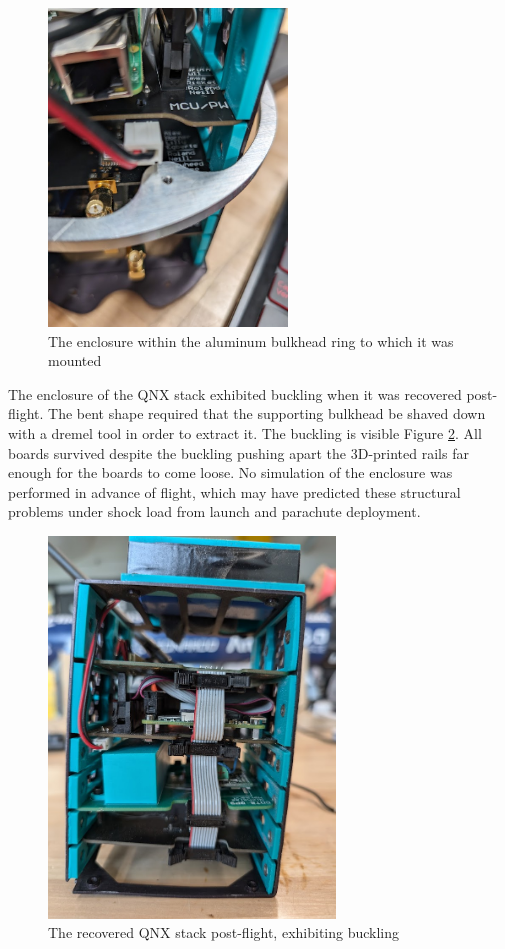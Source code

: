 \begin{figure}[H]
    \center
    \includegraphics[width=2.5in]{assets/images/stack-bulkhead.jpg}
    \caption{The enclosure within the aluminum bulkhead ring to which it was mounted}
    \label{fig:stack-bulkhead}
\end{figure}

The enclosure of the QNX stack exhibited buckling when it was recovered post-flight. The bent shape required that the
supporting bulkhead be shaved down with a dremel tool in order to extract it. The buckling is visible Figure
\ref{fig:stack-bent}. All boards survived despite the buckling pushing apart the 3D-printed rails far enough for the
boards to come loose. No simulation of the enclosure was performed in advance of flight, which may have predicted these
structural problems under shock load from launch and parachute deployment.

\begin{figure}[H]
    \center
    \includegraphics[width=3in]{assets/images/bent-stack.jpg}
    \caption{The recovered QNX stack post-flight, exhibiting buckling}
    \label{fig:stack-bent}
\end{figure}

